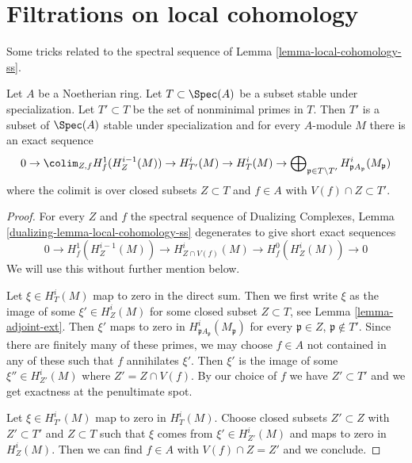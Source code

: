 \section{Filtrations on local cohomology}
\label{section-filter-local-cohomology}

\noindent
Some tricks related to the spectral sequence of
Lemma \ref{lemma-local-cohomology-ss}.

\begin{lemma}
\label{lemma-filter-local-cohomology}
Let $A$ be a Noetherian ring. Let $T \subset \Spec(A)$
be a subset stable under specialization. Let $T' \subset T$ be
the set of nonminimal primes in $T$. Then $T'$
is a subset of $\Spec(A)$ stable under specialization
and for every $A$-module $M$ there is an exact sequence
$$
0 \to
\colim_{Z, f} H^1_f(H^{i - 1}_Z(M)) \to
H^i_{T'}(M) \to H^i_T(M) \to
\bigoplus\nolimits_{\mathfrak p \in T \setminus T'}
H^i_{\mathfrak p A_\mathfrak p}(M_\mathfrak p)
$$
where the colimit is over closed subsets $Z \subset T$
and $f \in A$ with $V(f) \cap Z \subset T'$.
\end{lemma}

\begin{proof}
For every $Z$ and $f$ the spectral sequence of
Dualizing Complexes, Lemma \ref{dualizing-lemma-local-cohomology-ss}
degenerates to give short exact sequences
$$
0 \to H^1_f(H^{i - 1}_Z(M)) \to
H^i_{Z \cap V(f)}(M) \to H^0_f(H^i_Z(M)) \to 0
$$
We will use this without further mention below.

\medskip\noindent
Let $\xi \in H^i_T(M)$ map to zero in the direct sum.
Then we first write $\xi$ as the image of some $\xi' \in H^i_Z(M)$
for some closed subset $Z \subset T$, see Lemma \ref{lemma-adjoint-ext}.
Then $\xi'$ maps to zero in $H^i_{\mathfrak p A_\mathfrak p}(M_\mathfrak p)$
for every $\mathfrak p \in Z$, $\mathfrak p \not \in T'$.
Since there are finitely many of these primes,
we may choose $f \in A$ not contained in any of these
such that $f$ annihilates $\xi'$. Then $\xi'$
is the image of some $\xi'' \in H^i_{Z'}(M)$
where $Z' = Z \cap V(f)$. By our choice of $f$ we have
$Z' \subset T'$ and we get exactness at the penultimate spot.

\medskip\noindent
Let $\xi \in H^i_{T'}(M)$ map to zero in $H^i_T(M)$.
Choose closed subsets $Z' \subset Z$ with $Z' \subset T'$
and $Z \subset T$ such that $\xi$ comes from $\xi' \in H^i_{Z'}(M)$
and maps to zero in $H^i_Z(M)$. Then we can find $f \in A$
with $V(f) \cap Z = Z'$ and we conclude.
\end{proof}

